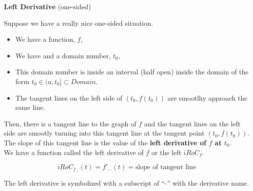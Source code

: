 \documentclass{ximera}
\begin{document}
\begin{definition} \textbf{\textcolor{green!50!black}{Left Derivative}}  (one-sided) 


Suppose we have a really nice one-sided situation.


\begin{itemize}
\item We have a function, $f$, 
\item We have and a domain number, $t_0$, 
\item This domain number is inside an interval (half open) inside the domain of the form  $t_0 \in (a, t_0] \subset Domain$. 
\item The tangent lines on the left side of $(t_0, f(t_0))$ are smootlhy approach the same line.
\end{itemize}

Then, there is a tangent line to the graph of $f$ and the tangent lines on the left side are smootly turning into this tangent line at the tangent point $(t_0, f(t_0))$. \\

The slope of this tangent line is the value of the \textbf{left derivative of $f$ at $t_0$}. \\

We have a function called the left derivative of $f$ or the left $iRoC_f$.

\[
iRoC_{f_{-}}(t) =f'_{-}(t) = \text{slope of tangent line}
\]

The left derivative is symbolized with a subscript of ``-'' with the derivative name. \\
 

\end{definition}
\end{document}
